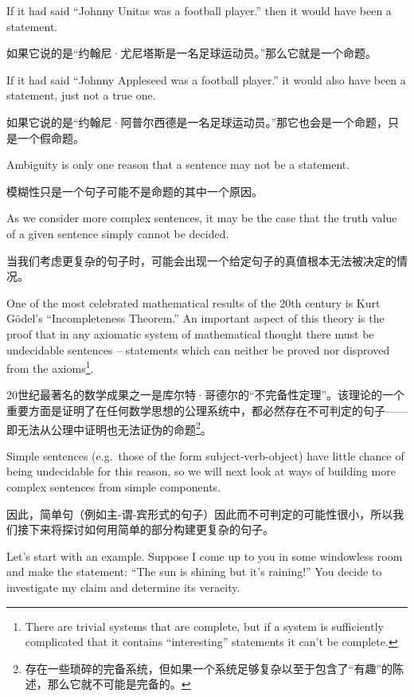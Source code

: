 If it had said ``Johnny Unitas was a football player.'' then
it would have been a statement.

如果它说的是“约翰尼·尤尼塔斯是一名足球运动员。”那么它就是一个命题。

If it had said ``Johnny Appleseed was a 
football player.'' it would also have been a statement, just not a true one.

如果它说的是“约翰尼·阿普尔西德是一名足球运动员。”那它也会是一个命题，只是一个假命题。

Ambiguity is only one reason that a sentence may not be a statement.

模糊性只是一个句子可能不是命题的其中一个原因。

As 
we consider more complex sentences, it may be the case that the truth
value of a given sentence simply cannot be decided.

当我们考虑更复杂的句子时，可能会出现一个给定句子的真值根本无法被决定的情况。

One of the most
celebrated mathematical results of the 20th century is 
Kurt G\"{o}del's
``Incompleteness Theorem.''  
An important aspect of this theory is 
the proof that in any axiomatic system of mathematical thought
there must be undecidable sentences -- statements which can neither be proved
nor disproved from the axioms\footnote{There are trivial systems that %
are complete, but if a system is sufficiently complicated that it contains %
``interesting'' statements it can't be complete. }.

20世纪最著名的数学成果之一是库尔特·哥德尔的“不完备性定理”。该理论的一个重要方面是证明了在任何数学思想的公理系统中，都必然存在不可判定的句子——即无法从公理中证明也无法证伪的命题\footnote{存在一些琐碎的完备系统，但如果一个系统足够复杂以至于包含了“有趣”的陈述，那么它就不可能是完备的。}。

Simple sentences (e.g.\ those of the form 
subject-verb-object) have little chance of being undecidable for this
reason, so we will next look at ways of building more complex sentences
from simple components.

因此，简单句（例如主-谓-宾形式的句子）因此而不可判定的可能性很小，所以我们接下来将探讨如何用简单的部分构建更复杂的句子。

Let's start with an example.  Suppose I come up to you in some windowless
room and make the statement: ``The sun is shining but it's raining!''  
You decide to investigate my claim and determine its veracity.

